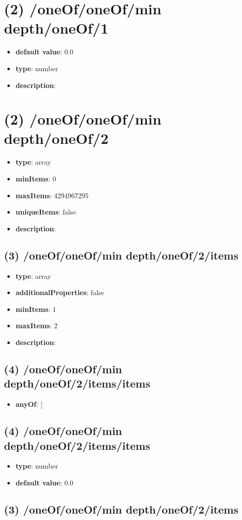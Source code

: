 \section{(2) /oneOf/oneOf/min depth/oneOf/1}
\begin{itemize}[leftmargin=2em]\item {\bf default value}: 0.0
\item {\bf type}: number
\item {\bf description}: 
\end{itemize}\section{(2) /oneOf/oneOf/min depth/oneOf/2}
\begin{itemize}[leftmargin=2em]\item {\bf type}: array
\item {\bf minItems}: 0
\item {\bf maxItems}: 4294967295
\item {\bf uniqueItems}: false
\item {\bf description}: 
\end{itemize}\subsection{(3) /oneOf/oneOf/min depth/oneOf/2/items}
\begin{itemize}[leftmargin=3em]\item {\bf type}: array
\item {\bf additionalProperties}: false
\item {\bf minItems}: 1
\item {\bf maxItems}: 2
\item {\bf description}: 
\end{itemize}\subsection{(4) /oneOf/oneOf/min depth/oneOf/2/items/items}
\begin{itemize}[leftmargin=4em]\item {\bf anyOf}: [\end{itemize}\subsection{(4) /oneOf/oneOf/min depth/oneOf/2/items/items}
\begin{itemize}[leftmargin=4em]\item {\bf type}: number\item {\bf default value}: 0.0
\end{itemize}\subsection{(3) /oneOf/oneOf/min depth/oneOf/2/items}
